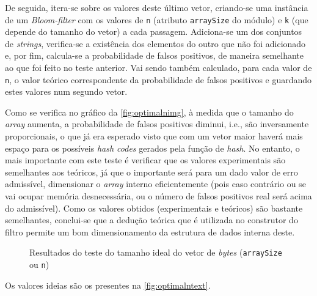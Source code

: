 \documentclass[a4paper,11pt,openright,oneside]{report}
\begin{document}
De seguida, itera-se sobre os valores deste último vetor, criando-se uma instância de um \textit{Bloom-filter} com os valores de \texttt{n} (atributo \texttt{arraySize} do módulo) e \texttt{k} (que depende do tamanho do vetor) a cada passagem. Adiciona-se um dos conjuntos de \textit{strings}, verifica-se a existência dos elementos do outro que não foi adicionado e, por fim, calcula-se a probabilidade de falsos positivos, de maneira semelhante ao que foi feito no teste anterior. Vai sendo também calculado, para cada valor de \texttt{n}, o valor teórico correspondente da probabilidade de falsos positivos e guardando estes valores num segundo vetor.

Como se verifica no gráfico da \autoref{fig:optimalnimg}, à medida que o tamanho do \textit{array} aumenta, a probabilidade de falsos positivos diminui, i.e., são inversamente proporcionais, o que já era esperado visto que com um vetor maior haverá mais espaço para os possíveis \textit{hash codes} gerados pela função de \textit{hash}. No entanto, o mais importante com este teste é verificar que os valores experimentais são semelhantes aos teóricos, já que o importante será para um dado valor de erro admissível, dimensionar o \textit{array} interno eficientemente (pois caso contrário ou se vai ocupar memória desnecessária, ou o número de falsos positivos real será acima do admissível). Como os valores obtidos (experimentais e teóricos) são bastante semelhantes, conclui-se que a dedução teórica que é utilizada no construtor do filtro permite um bom dimensionamento da estrutura de dados interna deste.

\begin{figure}[ht]
\center
{}
\caption{Resultados do teste do tamanho ideal do vetor de \textit{bytes} (\texttt{arraySize} ou \texttt{n})}
\label{fig:optimalnimg}
\end{figure}

Os valores ideias são os presentes na \autoref{fig:optimalntext}.
\end{document}
